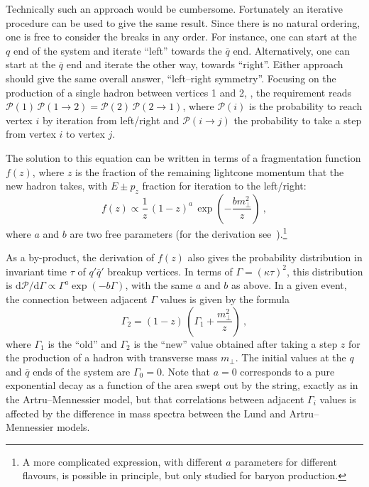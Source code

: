 Technically such an approach would be cumbersome. Fortunately 
an iterative procedure can be used to give the same result.
Since there is no natural ordering, one is free to consider the 
breaks in any order. For instance, one can start
at the $q$ end of the system and iterate ``left'' towards the 
$\overline{q}$ end. Alternatively, one can start at the 
$\overline{q}$ end and iterate the other way, towards ``right''. 
Either approach should give the same overall answer,
``left--right symmetry''. Focusing on the production of a single
hadron between vertices 1 and 2, ,
the requirement reads $\mathcal{P}(1) \, \mathcal{P}(1 \to 2) =
\mathcal{P}(2) \, \mathcal{P}(2 \to 1)$, where $\mathcal{P}(i)$
is the probability to reach vertex $i$ by iteration from left/right
and $\mathcal{P}(i \to j)$ the probability to take a step from 
vertex $i$ to vertex $j$.  

The solution to this equation can be written in terms of a 
fragmentation function $f(z)$, where $z$ is the fraction of 
the remaining lightcone momentum that the new hadron takes,
with $E \pm p_z$ fraction for iteration to the left/right:
\begin{equation}
f(z) \propto \frac{1}{z} \, (1 - z)^a \, 
\exp\left( - \frac{b m_{\perp}^2}{z} \right) ~,            
\label{eq:stringfz}
\end{equation}
where $a$ and $b$ are two free parameters (for the derivation
see~\cite{Andersson:1983jt}).\footnote{A more complicated
  expression, with different $a$ parameters for different flavours, is
  possible in principle, but only studied for baryon production.} 

As a by-product, the derivation of $f(z)$ also gives the probability 
distribution in invariant time $\tau$ of $q'\overline{q}'$ breakup 
vertices. In terms of $\Gamma = (\kappa\tau)^2$, this distribution is
$\mathrm{d}\mathcal{P}/\mathrm{d}\Gamma \propto  \Gamma^a \exp(-b \Gamma)$,
with the same $a$ and $b$ as above. In a given event, the connection 
between adjacent $\Gamma$ values is given by the formula
\begin{equation}
\Gamma_2 = (1 - z) \, \left( \Gamma_1 + \frac{m_{\perp}^2}{z} \right) ~, 
\label{eq:stringgamma}
\end{equation}
where $\Gamma_1$ is the ``old'' and $\Gamma_2$ is the ``new'' value 
obtained after taking a step $z$ for the production of a hadron 
with transverse mass $m_{\perp}$. The initial values at the $q$ and 
$\overline{q}$ ends of the system are $\Gamma_0 = 0$. Note that
$a = 0$ corresponds to a pure exponential decay as a function of 
the area swept out by the string, exactly as in the Artru--Mennessier 
model, but that correlations between adjacent $\Gamma_i$ values is  
affected by the difference in mass spectra between the Lund and 
Artru--Mennessier models. 

